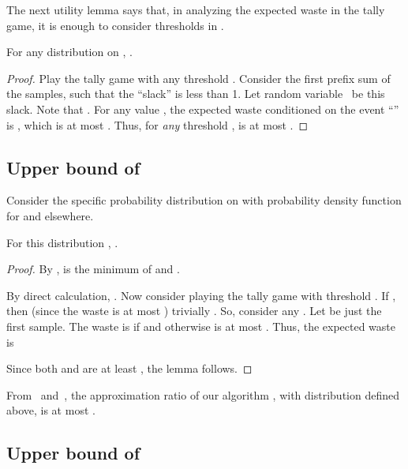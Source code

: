 The next utility lemma
says that, in analyzing the expected waste in the tally game,
it is enough to consider thresholds  in .

\begin{lemma}\label{lemma: 01}
  For any distribution  on ,
  .
\end{lemma}

\begin{proof}
  Play the tally game with any threshold .  
  Consider the first prefix sum 
  of the samples, such that the ``slack'' 
   is less than 1.
  Let random variable~ be this slack.  Note that . 
  For any value ,
  the expected waste conditioned on the event ``'' is ,
  which is at most .
  Thus, for \emph{any} threshold ,  
  is at most . 
\end{proof}




\subsection{Upper bound of \texorpdfstring{}{e/(e-1) = 1.582}}

Consider the specific probability distribution  on 
with probability density function  for 
and  elsewhere.

\begin{lemma}\label{lemma: upper bound 1}
  For this distribution , .
\end{lemma}

\begin{proof}
  By ,
   is the minimum of  
  and .

  By direct calculation,
  .
  Now
  consider playing the tally game with threshold .
  If , then (since the waste is at most )
  trivially .
  So, consider any .  Let  be just the first sample.
  The waste is  if  and otherwise is at most .
	Thus,  the expected waste is 

	

Since  both  and
 are at least , the lemma follows.
\end{proof}

From ~and~,
the approximation ratio of our
algorithm , with distribution  defined above,
is at most .



\subsection{Upper bound of \texorpdfstring{}{1.574}}

